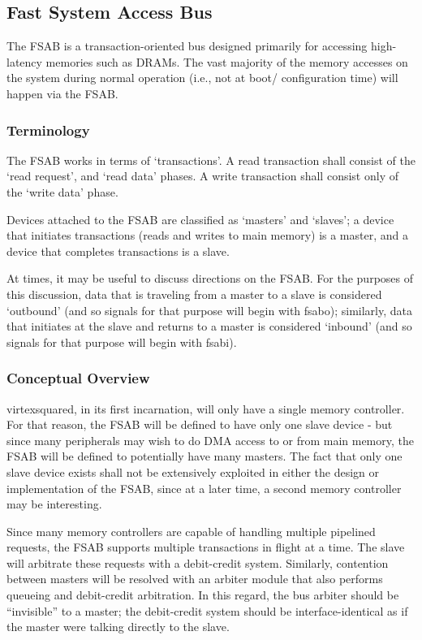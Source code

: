 \documentclass[10pt]{article}
\begin{document}
\subsection{Fast System Access Bus}

\label{sec:fsab}

The FSAB is a transaction-oriented bus designed primarily for accessing high-
latency memories such as DRAMs. The vast majority of the memory accesses on 
the system during normal operation (i.e., not at boot/ configuration time) 
will happen via the FSAB. 

\subsubsection{Terminology}

The FSAB works in terms of `transactions'. A read transaction shall consist 
of the `read request', and `read data' phases. A write transaction shall 
consist only of the `write data' phase.

Devices attached to the FSAB are classified as `masters' and `slaves'; a 
device that initiates transactions (reads and writes to main memory) is a 
master, and a device that completes transactions is a slave.

At times, it may be useful to discuss directions on the FSAB. For the purposes
of this discussion, data that is traveling from a master to a slave is 
considered `outbound' (and so signals for that purpose will begin with fsabo); 
similarly, data that initiates at the slave and returns to a master is 
considered `inbound' (and so signals for that purpose will begin with fsabi).


\subsubsection{Conceptual Overview}

virtexsquared, in its first incarnation, will only have a single memory 
controller. For that reason, the FSAB will be defined to have only one slave 
device - but since many peripherals may wish to do DMA access to or from main 
memory, the FSAB will be defined to potentially have many masters. The fact 
that only one slave device exists shall not be extensively exploited in either 
the design or implementation of the FSAB, since at a later time, a second 
memory controller may be interesting.

Since many memory controllers are capable of handling multiple pipelined 
requests, the FSAB supports multiple transactions in flight at a time. The 
slave will arbitrate these requests with a debit-credit system. Similarly, 
contention between masters will be resolved with an arbiter module that also 
performs queueing and debit-credit arbitration. In this regard, the bus 
arbiter should be ``invisible'' to a master; the debit-credit system should be 
interface-identical as if the master were talking directly to the slave.
\end{document}
